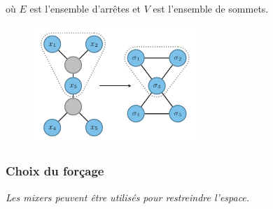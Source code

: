 où $E$ est l'ensemble d'arrêtes et $V$ est l'ensemble de sommets.

\begin{figure}[h]
    \centering
    \includegraphics[width=0.55\textwidth]{figures/ising-mapping}
    \caption[Transformation du problème \#NAE3SAT et \#1-in-3SAT au modèle d'Ising]{}
    \label{fig:transformation-ising}
\end{figure}



\subsubsection{Choix du forçage}

\textcolor{mydarkred}{\textit{Les mixers peuvent être utilisés pour restreindre l'espace.}}


